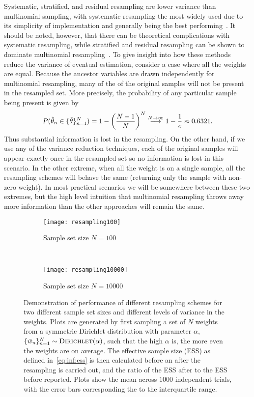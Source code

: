Systematic, stratified, and residual resampling are lower variance than multinomial sampling, 
with systematic resampling the most widely used due to its simplicity of implementation and
generally being the best performing~\cite{doucet2009tutorial}.  It should be noted, however, that
there can be theoretical complications with systematic resampling, while stratified and 
residual resampling can be shown to dominate multinomial resampling~\citep{douc2005comparison}.
To give insight into how these methods reduce the variance of eventual estimation, consider
a case where all the weights are equal.  Because the ancestor variables are drawn independently
for multinomial resampling, many of the of the original samples will not be present in the resampled
set.  More precisely, the probability of any particular sample being present is given by
\[
P(\hat{\theta}_n \in \{\tilde{\theta}\}_{n=1}^N) = 1-\left(\frac{N-1}{N}\right)^{N} 
\overset{N\to\infty}{\longrightarrow} 1-\frac{1}{e} \approx 0.6321.
\]
Thus substantial information is lost in the resampling.
On the other hand, if we use any of the variance reduction techniques, each of the original samples
will appear exactly once in the resampled set so no information is lost in this scenario.  In the
other extreme, when all the weight is on a single sample, all the resampling schemes will behave the
same (returning only the sample with non-zero weight).  In most practical scenarios we will be
somewhere between these two extremes, but the high level intuition that multinomial resampling
throws away more information than the other approaches will remain the same.

\begin{figure}[t]
	\centering
	\begin{subfigure}[t]{0.49\textwidth}
	\texttt{[image: resampling100]}
	\caption{Sample set size $N=100$}
	\end{subfigure}
	~
	\begin{subfigure}[t]{0.49\textwidth}
	\texttt{[image: resampling10000]}
	\caption{Sample set size $N=10000$}
	\end{subfigure}
	\caption{Demonstration of performance of different resampling schemes for
		two different sample set sizes and different levels of variance in the weights.
		Plots are generated by first sampling a set of $N$ weights from a symmetric
		Dirichlet distribution with parameter $\alpha$, 
		$\{\bar{w}_n\}_{n=1}^N \sim \textsc{Dirichlet}(\alpha)$, such that the
		high $\alpha$ is, the more even the weights are on average.  The effective
		sample size (ESS) as defined in~\eqref{eq:inf:ess} is then calculated before an after the
		resampling is carried out, and the ratio of the ESS after to the ESS before
		reported.  Plots show the mean across $1000$ independent trials, with the
		error bars corresponding the to the interquartile range.
		\label{fig:inf:resample}}
\end{figure}

